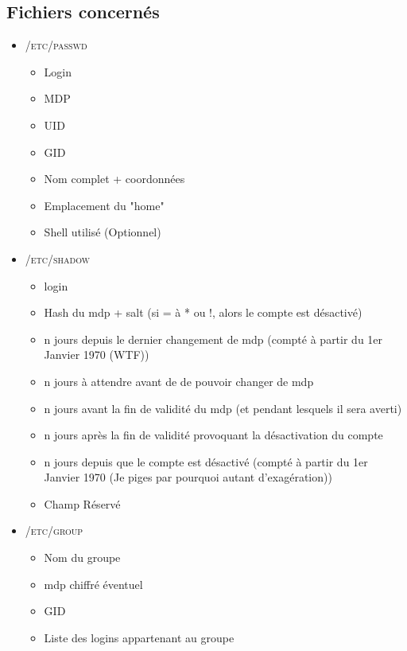 \documentclass[a4paper]{article}
\begin{document}
    \subsection{Fichiers concernés}
    \begin{itemize}
      \item \textsc{/etc/passwd}
      \begin{itemize}[label=, font=\scriptsize]
        \item Login
        \item MDP
        \item UID
        \item GID
        \item Nom complet + coordonnées
        \item Emplacement du "home"
        \item Shell utilisé (Optionnel)
      \end{itemize}
      \item \textsc{/etc/shadow}
      \begin{itemize}[label=, font=\scriptsize]
        \item login
        \item Hash du mdp + salt (si = à * ou !, alors le compte est désactivé)
        \item n jours depuis le dernier changement de mdp (compté à partir du 1er Janvier 1970 (WTF))
        \item n jours à attendre avant de de pouvoir changer de mdp
        \item n jours avant la fin de validité du mdp (et pendant lesquels il sera averti)
        \item n jours après la fin de validité provoquant la désactivation du compte
        \item n jours depuis que le compte est désactivé (compté à partir du 1er Janvier 1970 (Je piges par pourquoi autant d'exagération))
        \item Champ Réservé
      \end{itemize}
      \item \textsc{/etc/group}
      \begin{itemize}[label=, font=\scriptsize]
        \item Nom du groupe
        \item mdp chiffré éventuel
        \item GID
        \item Liste des logins appartenant au groupe
      \end{itemize}
    \end{itemize}
\end{document}
